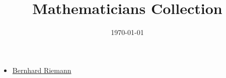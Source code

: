 \documentclass[11pt,a4paper]{article}
\title{Mathematicians Collection}
\author{}
\date{\today}
\begin{document}
\maketitle
\begin{itemize}[leftmargin=*]
  \item \href{Bernhard_Riemann/Bernhard_Riemann.pdf}{Bernhard Riemann}
\end{itemize}
\end{document}
